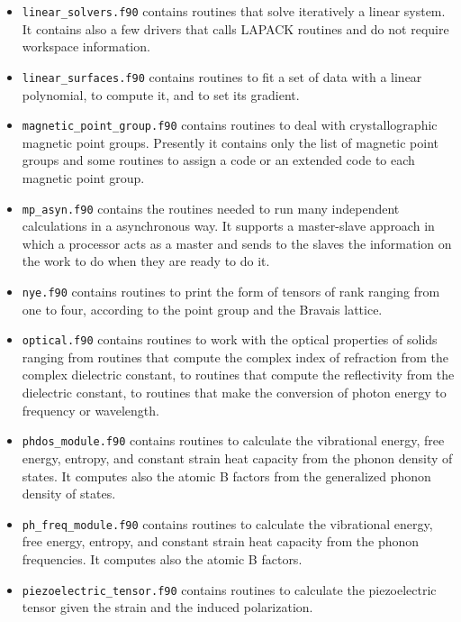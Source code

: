 \documentclass[12pt,a4paper,twoside]{report}
\begin{document}
\begin{itemize}
\item
\texttt{linear\_solvers.f90} contains routines that solve iteratively
a linear system. It contains also a few drivers that calls LAPACK routines
and do not require workspace information. 

\item
\texttt{linear\_surfaces.f90} contains routines to fit a set of data
with a linear polynomial, to compute it, and to set its gradient.  

\item
\texttt{magnetic\_point\_group.f90} contains routines to deal with 
crystallographic
magnetic point groups. Presently it contains only the list of magnetic
point groups and some routines to assign a code or an extended code to each
magnetic point group.

\item
\texttt{mp\_asyn.f90} contains the routines needed to run many 
independent calculations in a asynchronous way. It supports a master-slave
approach in which a processor acts as a master and sends to the slaves
the information on the work to do when they are ready to do it.

\item
\texttt{nye.f90} contains routines to print the form of tensors of
rank ranging from one to four, according to the point group and the
Bravais lattice.

\item
\texttt{optical.f90} contains routines to work with the optical properties
of solids ranging from routines that compute the complex index of refraction
from the complex dielectric constant, to routines that compute the
reflectivity from the dielectric constant, to routines that make
the conversion of photon energy to frequency or wavelength.

\item
\texttt{phdos\_module.f90} contains routines to calculate the vibrational
energy, free energy, entropy, and constant strain heat capacity from the
phonon density of states. It computes also the atomic B factors from the
generalized phonon density of states.

\item
\texttt{ph\_freq\_module.f90} contains routines to calculate the vibrational
energy, free energy, entropy, and constant strain heat capacity from the
phonon frequencies. It computes also the atomic B factors.

\item
\texttt{piezoelectric\_tensor.f90} contains routines to calculate the
piezoelectric tensor given the strain and the induced polarization.


\end{itemize}
\end{document}
